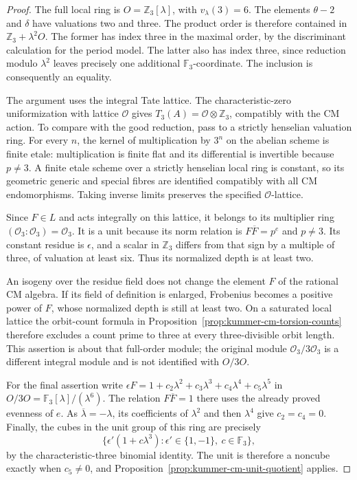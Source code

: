 \documentclass[11pt]{article}
\theoremstyle{definition}
\theoremstyle{remark}
\begin{document}
\begin{proof}
The full local ring is \(O=\mathbb Z_3[\lambda]\), with
\(v_\lambda(3)=6\). The elements \(\theta-2\) and
\(\delta\) have valuations two and three. The product order
is therefore contained in \(\mathbb Z_3+\lambda^2O\).
The former has index three in the maximal order, by the
discriminant calculation for the period model. The latter
also has index three, since reduction modulo \(\lambda^2\)
leaves precisely one additional \(\mathbb F_3\)-coordinate.
The inclusion is consequently an equality.

The argument uses the integral Tate lattice. The characteristic-zero uniformization with
lattice \(\mathcal O\) gives
\(T_3(A)=\mathcal O\otimes\mathbb Z_3\), compatibly with
the CM action. To compare with the good reduction, pass to a
strictly henselian valuation ring. For every \(n\), the kernel
of multiplication by \(3^n\) on the abelian scheme is finite
etale: multiplication is finite flat and its differential is
invertible because \(p\ne3\). A finite etale scheme over a
strictly henselian local ring is constant, so its geometric
generic and special fibres are identified compatibly with
all CM endomorphisms. Taking inverse limits preserves the
specified \(\mathcal O\)-lattice.

Since \(F\in L\) and acts integrally on this lattice, it
belongs to its multiplier ring
\((\mathcal O_3:\mathcal O_3)=\mathcal O_3\).
It is a unit because its norm relation is
\(F\overline F=p^e\) and \(p\ne3\). Its constant residue
is \(\epsilon\), and a scalar in \(\mathbb Z_3\) differs
from that sign by a multiple of three, of valuation at least
six. Thus its normalized depth is at least two.

An isogeny over the residue field does not change the element \(F\) of the rational
CM algebra. If its field of definition is enlarged, Frobenius becomes
a positive power of \(F\), whose normalized depth is still at least two. On a saturated local lattice the orbit-count
formula in Proposition~\ref{prop:kummer-cm-torsion-counts}
therefore excludes a count prime to three at every
three-divisible orbit length. This assertion is about that
full-order module; the original module
\(\mathcal O_3/3\mathcal O_3\) is a different integral
module and is not identified with \(O/3O\).

For the final assertion write
\(\epsilon F=1+c_2\lambda^2+c_3\lambda^3+
c_4\lambda^4+c_5\lambda^5\) in
\(O/3O=\mathbb F_3[\lambda]/(\lambda^6)\).
The relation \(F\overline F=1\) there uses the already
proved evenness of \(e\). As
\(\overline\lambda=-\lambda\), its coefficients of
\(\lambda^2\) and then \(\lambda^4\) give
\(c_2=c_4=0\). Finally, the cubes in the unit group of
this ring are precisely
\[
 \{\epsilon'(1+c\lambda^3):\epsilon'\in\{1,-1\},
                                   \ c\in\mathbb F_3\},
\]
by the characteristic-three binomial identity. The unit is
therefore a noncube exactly when \(c_5\ne0\), and
Proposition~\ref{prop:kummer-cm-unit-quotient} applies.
\end{proof}
\end{document}

